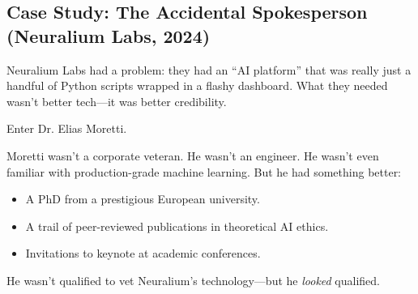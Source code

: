 \subsection{Case Study: The Accidental Spokesperson (Neuralium Labs, 2024)}

Neuralium Labs had a problem: they had an “AI platform” that was really just a handful of Python scripts wrapped in a flashy dashboard. What they needed wasn’t better tech—it was better credibility.

Enter Dr. Elias Moretti.

Moretti wasn’t a corporate veteran. He wasn’t an engineer. He wasn’t even familiar with production-grade machine learning.  But he had something better:  

\begin{itemize}
  \item A PhD from a prestigious European university.
  \item A trail of peer-reviewed publications in theoretical AI ethics.
  \item Invitations to keynote at academic conferences.
\end{itemize}

He wasn’t qualified to vet Neuralium’s technology—but he \textit{looked} qualified.

